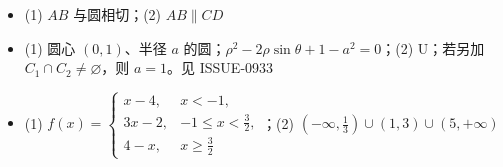 \begin{itemize}[leftmargin=2.6em]
  \item[\textbf{22.}] (1) \(AB\) 与圆相切；(2) \(AB\parallel CD\)
  \item[\textbf{23.}] (1) 圆心 \((0,1)\)、半径 \(a\) 的圆；\(\rho^2-2\rho\sin\theta+1-a^2=0\)；(2) U；若另加 \(C_1\cap C_2\ne\varnothing\)，则 \(a=1\)。见 ISSUE-0933
  \item[\textbf{24.}] (1) $f(x)=\begin{cases}x-4,&x<-1,\\3x-2,&-1\le x<\frac32,\\4-x,&x\ge\frac32\end{cases}$；(2) \((-\infty,\frac13)\cup(1,3)\cup(5,+\infty)\)
\end{itemize}
